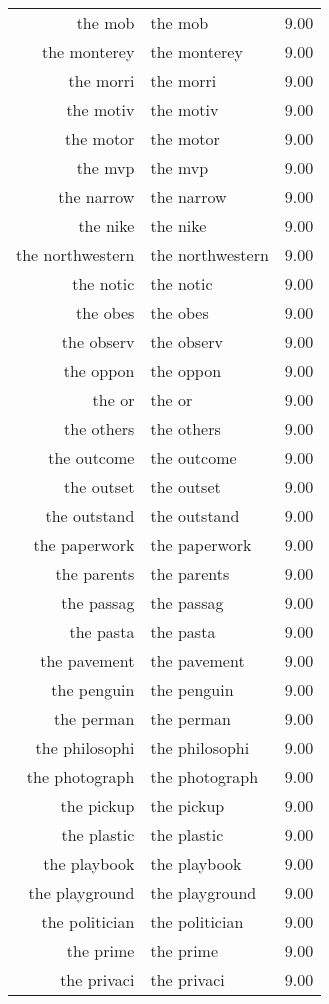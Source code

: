 \begin{table}[ht]
\begin{tabular}{rlr}
  the mob & the mob & 9.00 \\ 
  the monterey & the monterey & 9.00 \\ 
  the morri & the morri & 9.00 \\ 
  the motiv & the motiv & 9.00 \\ 
  the motor & the motor & 9.00 \\ 
  the mvp & the mvp & 9.00 \\ 
  the narrow & the narrow & 9.00 \\ 
  the nike & the nike & 9.00 \\ 
  the northwestern & the northwestern & 9.00 \\ 
  the notic & the notic & 9.00 \\ 
  the obes & the obes & 9.00 \\ 
  the observ & the observ & 9.00 \\ 
  the oppon & the oppon & 9.00 \\ 
  the or & the or & 9.00 \\ 
  the others & the others & 9.00 \\ 
  the outcome & the outcome & 9.00 \\ 
  the outset & the outset & 9.00 \\ 
  the outstand & the outstand & 9.00 \\ 
  the paperwork & the paperwork & 9.00 \\ 
  the parents & the parents & 9.00 \\ 
  the passag & the passag & 9.00 \\ 
  the pasta & the pasta & 9.00 \\ 
  the pavement & the pavement & 9.00 \\ 
  the penguin & the penguin & 9.00 \\ 
  the perman & the perman & 9.00 \\ 
  the philosophi & the philosophi & 9.00 \\ 
  the photograph & the photograph & 9.00 \\ 
  the pickup & the pickup & 9.00 \\ 
  the plastic & the plastic & 9.00 \\ 
  the playbook & the playbook & 9.00 \\ 
  the playground & the playground & 9.00 \\ 
  the politician & the politician & 9.00 \\ 
  the prime & the prime & 9.00 \\ 
  the privaci & the privaci & 9.00 \\ 

\end{tabular}
\end{table}
